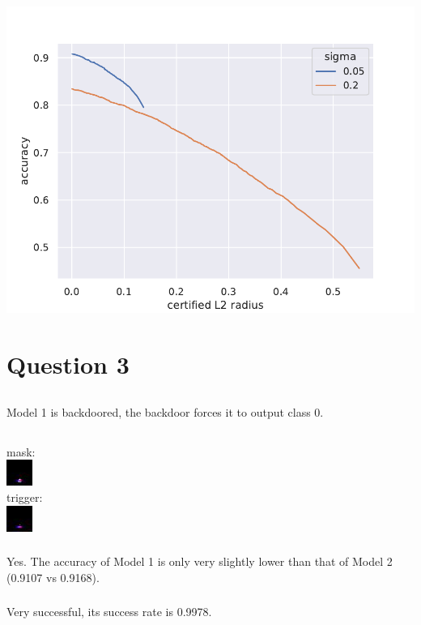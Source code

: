 \documentclass{article}
\begin{document}
\subsection{}
\includegraphics[scale=0.7]{randomized-smoothing-acc-vs-radius.pdf}

\section{Question 3}
\setcounter{subsection}{1}
\subsection{}
Model 1 is backdoored, the backdoor forces it to output class 0.
\subsection{}
\subsubsection{}
mask: \\
\includegraphics[scale=2]{backdoor-mask.jpg} \\
trigger: \\
\includegraphics[scale=2]{backdoor-trigger.jpg}
\subsubsection{}
Yes. The accuracy of Model 1 is only very slightly lower than that of Model 2 (0.9107 vs 0.9168).
\subsubsection{}
Very successful, its success rate is 0.9978.
\end{document}
